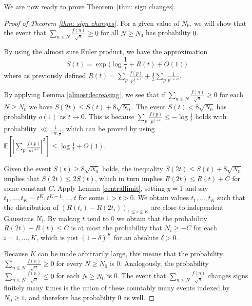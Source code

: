 \documentclass[12pt]{amsart}
\def\E{\mathbb E}
\theoremstyle{remark}
\theoremstyle{definition}
\theoremstyle{remark}
\numberwithin{equation}{section}
\begin{document}
We are now ready to prove Theorem~\ref{thm: sign changes}.
\begin{proof}[Proof of Theorem \ref{thm: sign changes}]
For a given value of $N_0$, we will show that the event that $\sum_{n \le N} \frac{f(n)}{\sqrt{n}} \ge 0$ for all $N \ge N_0$ has probability $0$.

By using the almost sure Euler product, we have the approximation
$$S(t) = \exp\Big(\log \frac{1}{t}+R(t)+O(1)\Big)$$
where as previously defined $R(t) = \sum_{p} \frac{f(p)}{p^{\frac{1}{2}+t}} + \frac{1}{2}\sum_{p} \frac{1}{p^{1+2t}}$.

By applying Lemma \ref{almostdecreasing}, we see that if $\sum_{n \le N} \frac{f(n)}{\sqrt{n}} \ge 0$ for each $N \ge N_0$ we have $S(2t) \le S(t)+8\sqrt{N_0}$. 
The event $S(t)<8\sqrt{N_0}$ has probability $o(1)$ as $t \rightarrow 0$.  This is because $\sum_{p} \frac{f(p)}{p^{\frac{1}{2}+t}} \le - \log \frac{1}{t}$ holds with probability $\ll\frac{1}{\log \frac{1}{t}}$, which can be proved by using $\E[|\sum_{p} \frac{f(p)}{p^{\frac{1}{2}+t}}|^{2}] \le \log \frac{1}{t} +O(1)$.

Given the event $S(t)\ge8\sqrt{N_0}$ holds, the inequality $S(2t) \le S(t)+8\sqrt{N_0}$ implies that $S(2t) \le 2S(t)$, which in turn implies $R(2t) \le R(t)+C$ for some constant $C$. Apply Lemma \ref{centrallimit}, setting $y = 1$ and say $t_1,\dots, t_K = t^K, t^{K-1},\dots, t$ for some $1>t>0$. We obtain values $t_1,\dots, t_K$ such that the distribution of $(R(t_i)-R(2t_i))_{1\le i \le K}$ are close to independent Gaussians $N_i$. By making $t$ tend to $0$ we obtain that the probability $R(2t) -R(t) \le C$ is at most the probability that $N_i \ge -C$ for each $i = 1,\dots, K$, which is just $(1-\delta)^K$ for an absolute $\delta >0$.

Because $K$ can be made arbitrarily large, this means that the probability $\sum_{n \le N} \frac{f(n)}{\sqrt{n}} \ge 0$ for every $N \ge N_0$ is $0$. Analogously, the probability $\sum_{n \le N} \frac{f(n)}{\sqrt{n}} \le 0$ for each $N \ge N_0$ is 0. The event that $\sum_{n\le N} \frac{f(n)}{\sqrt{n}}$ changes signs finitely many times is the union of these countably many events indexed by $N_0 \ge 1$, and therefore has probability 0 as well.

\end{proof}
\end{document}
